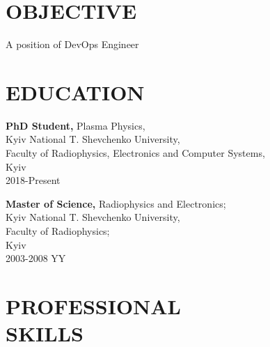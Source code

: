 \documentclass[mymargin,10pt]{res} %
\begin{document}
\begin{resume}


\section{OBJECTIVE}

A position of DevOps Engineer


\section{EDUCATION}

{\bf PhD Student,} Plasma Physics, \\
Kyiv National T. Shevchenko University, \\
Faculty of Radiophysics, Electronics and Computer Systems,\\ Kyiv \\
2018-Present

{\bf Master of Science,} Radiophysics and Electronics; \\
Kyiv National T. Shevchenko University, \\
Faculty of Radiophysics; \\
Kyiv \\
2003-2008 YY


\section{PROFESSIONAL \\ SKILLS}


\end{resume}
\end{document}
